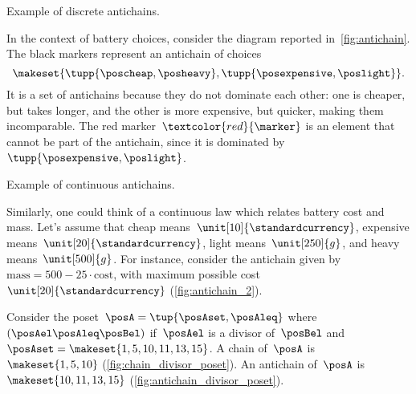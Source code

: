 \begin{marginfigure}
    \centering
    \caption{Example of discrete antichains.}
    \label{fig:antichain}
\end{marginfigure}
\begin{example}
    In the context of battery choices, consider the diagram reported in~\cref{fig:antichain}.
    The black markers represent an antichain of choices
    \begin{equation*}
        \makeset{
            \tupp{\poscheap,\posheavy},
            \tupp{\posexpensive,\poslight}
        }.
    \end{equation*}
    It is a set of antichains because they do not dominate each other: one is cheaper, but takes longer, and the other is more expensive, but quicker, making them incomparable.
    The red marker~$\textcolor{red}{\marker}$ is an element that cannot be part of the antichain, since it is dominated by~$\tupp{\posexpensive,\poslight}$.
    \begin{marginfigure}
        \centering
        \caption{Example of continuous antichains.}
        \label{fig:antichain_2}
    \end{marginfigure}

    Similarly, one could think of a continuous law which relates battery cost and mass.
    Let's assume that cheap means~$\unit[10]{\standardcurrency}$, expensive means~$\unit[20]{\standardcurrency}$, light means~$\unit[250]{g}$, and heavy means~$\unit[500]{g}$.
    For instance, consider the antichain given by~$\text{mass}=500-25\cdot \text{cost}$, with maximum possible cost~$\unit[20]{\standardcurrency}$ (\cref{fig:antichain_2}).
\end{example}

\vspace{5cm}

\begin{marginfigure}
    \begin{center}
    \end{center}
    \caption{\label{fig:chain_divisor_poset}}
\end{marginfigure}

\begin{marginfigure}
    \begin{center}
    \end{center}
    \caption{\label{fig:antichain_divisor_poset}}
\end{marginfigure}

\begin{example}
    Consider the poset~$\posA=\tup{\posAset,\posAleq}$ where~$(\posAel \posAleq \posBel)$ if~$\posAel$ is a divisor of~$\posBel$ and~$\posAset=\makeset{1,5,10,11,13,15}$.
    A chain of~$\posA$ is~$\makeset{1,5,10}$ (\cref{fig:chain_divisor_poset}).
    An antichain of~$\posA$ is~$\makeset{10,11,13,15}$ (\cref{fig:antichain_divisor_poset}).
\end{example}
